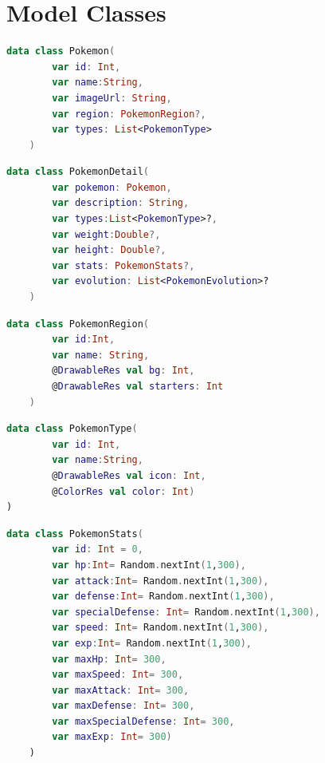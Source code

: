 \documentclass[a4paper, 12pt]{article}
\begin{document}


\appendix


\section{Model Classes}
\label{appendix:modelClass}

\begin{lstlisting}[caption={Pokemon Data Class.}, label={code:pk_class}, language=Kotlin]
    data class Pokemon(
        var id: Int,
        var name:String,
        var imageUrl: String,
        var region: PokemonRegion?,
        var types: List<PokemonType>
    ) 
\end{lstlisting}

\begin{lstlisting}[caption={Pokemon Detail Data Class.}, label={code:pk_detail_class}, language=Kotlin]
    data class PokemonDetail(
        var pokemon: Pokemon,
        var description: String,
        var types:List<PokemonType>?,
        var weight:Double?,
        var height: Double?,
        var stats: PokemonStats?,
        var evolution: List<PokemonEvolution>?
    )
\end{lstlisting}

\begin{lstlisting}[caption={Pokemon Region Data Class.}, label={code:pk_region_class}, language=Kotlin]
    data class PokemonRegion(
        var id:Int, 
        var name: String,
        @DrawableRes val bg: Int,
        @DrawableRes val starters: Int
    ) 
\end{lstlisting}

\begin{lstlisting}[caption={Pokemon Type Data Class.}, label={code:pk_type_class}, language=Kotlin]
    data class PokemonType(
        var id: Int, 
        var name:String,
        @DrawableRes val icon: Int,
        @ColorRes val color: Int) 
) 
\end{lstlisting}

\begin{lstlisting}[caption={Pokemon Stats Data Class.}, label={code:pk_stats_class}, language=Kotlin]
    data class PokemonStats(
        var id: Int = 0,
        var hp:Int= Random.nextInt(1,300),
        var attack:Int= Random.nextInt(1,300),
        var defense:Int= Random.nextInt(1,300),
        var specialDefense: Int= Random.nextInt(1,300),
        var speed: Int= Random.nextInt(1,300),
        var exp:Int= Random.nextInt(1,300),
        var maxHp: Int= 300,
        var maxSpeed: Int= 300,
        var maxAttack: Int= 300,
        var maxDefense: Int= 300,
        var maxSpecialDefense: Int= 300,
        var maxExp: Int= 300)
    ) 
\end{lstlisting}
\end{document}
